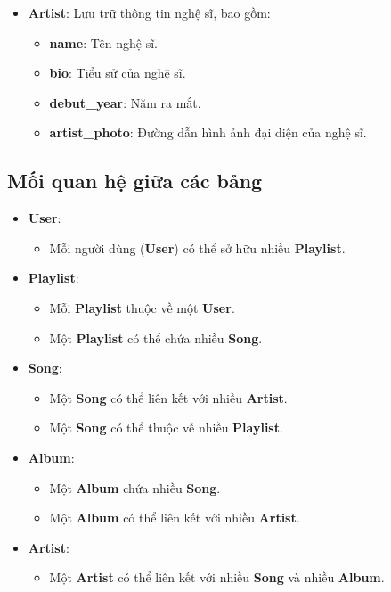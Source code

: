 \begin{itemize}
    \item \textbf{Artist}: Lưu trữ thông tin nghệ sĩ, bao gồm:
    \begin{itemize}
        \item \textbf{name}: Tên nghệ sĩ.
        \item \textbf{bio}: Tiểu sử của nghệ sĩ.
        \item \textbf{debut\_year}: Năm ra mắt.
        \item \textbf{artist\_photo}: Đường dẫn hình ảnh đại diện của nghệ sĩ.
    \end{itemize}
\end{itemize}

\subsection{Mối quan hệ giữa các bảng}
\begin{itemize}
    \item \textbf{User}:
    \begin{itemize}
        \item Mỗi người dùng (\textbf{User}) có thể sở hữu nhiều \textbf{Playlist}.
      
       
    \end{itemize}

    \item \textbf{Playlist}:
    \begin{itemize}
        \item Mỗi \textbf{Playlist} thuộc về một \textbf{User}.
        \item Một \textbf{Playlist} có thể chứa nhiều \textbf{Song}.
       
    \end{itemize}

    \item \textbf{Song}:
    \begin{itemize}
        \item Một \textbf{Song} có thể liên kết với nhiều \textbf{Artist}.
        \item Một \textbf{Song} có thể thuộc về nhiều \textbf{Playlist}.
       
    \end{itemize}

    \item \textbf{Album}:
    \begin{itemize}
        \item Một \textbf{Album} chứa nhiều \textbf{Song}.
        \item Một \textbf{Album} có thể liên kết với nhiều \textbf{Artist}.
       
    \end{itemize}

    \item \textbf{Artist}:
    \begin{itemize}
        \item Một \textbf{Artist} có thể liên kết với nhiều \textbf{Song} và nhiều \textbf{Album}.
      
    \end{itemize}
\end{itemize}


